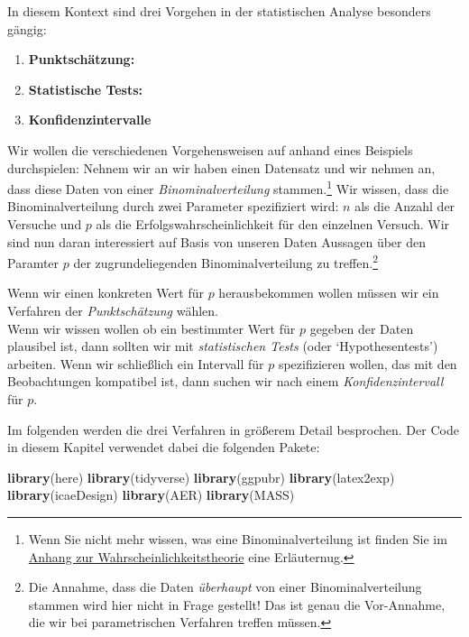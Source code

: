 \documentclass[]{book}
\newenvironment{Shaded}{\begin{snugshade}}{\end{snugshade}}
\newcommand{\KeywordTok}[1]{\textcolor[rgb]{0.13,0.29,0.53}{\textbf{#1}}}
\newcommand{\NormalTok}[1]{#1}
\let\rmarkdownfootnote\footnote%
\def\footnote{\protect\rmarkdownfootnote}
\begin{document}
In diesem Kontext sind drei Vorgehen in der statistischen Analyse
besonders gängig:

\begin{enumerate}
\def\labelenumi{\arabic{enumi}.}
\item
  \textbf{Punktschätzung:}
\item
  \textbf{Statistische Tests:}
\item
  \textbf{Konfidenzintervalle}
\end{enumerate}

Wir wollen die verschiedenen Vorgehensweisen auf anhand eines Beispiels
durchspielen: Nehnem wir an wir haben einen Datensatz und wir nehmen an,
dass diese Daten von einer \emph{Binominalverteilung} stammen.\footnote{Wenn
  Sie nicht mehr wissen, was eine Binominalverteilung ist finden Sie im
  \protect\hyperlink{stat-stoch}{Anhang zur Wahrscheinlichkeitstheorie}
  eine Erläuternug.} Wir wissen, dass die Binominalverteilung durch zwei
Parameter spezifiziert wird: \(n\) als die Anzahl der Versuche und \(p\)
als die Erfolgswahrscheinlichkeit für den einzelnen Versuch. Wir sind
nun daran interessiert auf Basis von unseren Daten Aussagen über den
Paramter \(p\) der zugrundeliegenden Binominalverteilung zu
treffen.\footnote{Die Annahme, dass die Daten \emph{überhaupt} von einer
  Binominalverteilung stammen wird hier nicht in Frage gestellt! Das ist
  genau die Vor-Annahme, die wir bei parametrischen Verfahren treffen
  müssen.}

Wenn wir einen konkreten Wert für \(p\) herausbekommen wollen müssen wir
ein Verfahren der \emph{Punktschätzung} wählen.\\
Wenn wir wissen wollen ob ein bestimmter Wert für \(p\) gegeben der
Daten plausibel ist, dann sollten wir mit \emph{statistischen Tests}
(oder `Hypothesentests') arbeiten. Wenn wir schließlich ein Intervall
für \(p\) spezifizieren wollen, das mit den Beobachtungen kompatibel
ist, dann suchen wir nach einem \emph{Konfidenzintervall} für \(p\).

Im folgenden werden die drei Verfahren in größerem Detail besprochen.
Der Code in diesem Kapitel verwendet dabei die folgenden Pakete:

\begin{Shaded}
\begin{Highlighting}[]
\KeywordTok{library}\NormalTok{(here)}
\KeywordTok{library}\NormalTok{(tidyverse)}
\KeywordTok{library}\NormalTok{(ggpubr)}
\KeywordTok{library}\NormalTok{(latex2exp)}
\KeywordTok{library}\NormalTok{(icaeDesign)}
\KeywordTok{library}\NormalTok{(AER)}
\KeywordTok{library}\NormalTok{(MASS)}
\end{Highlighting}
\end{Shaded}
\end{document}
